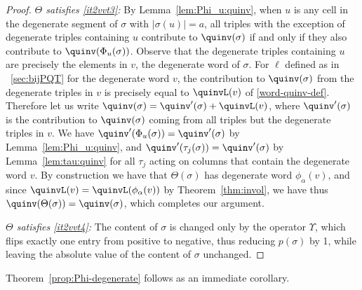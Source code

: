 \begin{proof}
\emph{$\Theta$ satisfies \ref{it2vvt3}:} By Lemma~\ref{lem:Phi_u:quinv}, when $u$ is any cell in the degenerate segment of $\sigma$ with $|\sigma(u)|=a$, all triples with the exception of degenerate triples containing $u$ contribute to $\quinv(\sigma)$ if and only if they also contribute to $\quinv(\Phi_u(\sigma))$. Observe that the degenerate triples containing $u$ are precisely the elements in $v$, the degenerate word of $\sigma$. For $\ell$ defined as in ~\ref{sec:bijPQT} for the degenerate word $v$,  the contribution to $\quinv(\sigma)$ from the degenerate triples in $v$ is precisely equal to $\quinvL(v)$ of \eqref{word-quinv-def}. Therefore let us write $\quinv(\sigma)=\quinv'(\sigma)+\quinvL(v)$, where $\quinv'(\sigma)$ is the contribution to $\quinv(\sigma)$ coming from all triples but the degenerate triples in $v$. We have $\quinv'(\Phi_u(\sigma))=\quinv'(\sigma)$ by Lemma~\ref{lem:Phi_u:quinv}, and $\quinv'(\tau_j(\sigma))=\quinv'(\sigma)$ by Lemma~\ref{lem:tau:quinv} for all $\tau_j$ acting on columns that contain the degenerate word $v$. By construction we have that $\Theta(\sigma)$ has degenerate word $\phi_\alpha(v)$, and since $\quinvL(v)=\quinvL(\phi_\alpha(v))$ by Theorem~\ref{thm:invol}, we have thus $\quinv(\Theta(\sigma))=\quinv(\sigma)$, which completes our argument.

\emph{$\Theta$ satisfies \ref{it2vvt4}:} The content of $\sigma$ is changed only by the operator $\Upsilon$, which flips exactly one entry from positive to negative, thus reducing $p(\sigma)$ by 1, while leaving the absolute value of the content of $\sigma$ unchanged.
\end{proof}
Theorem~\ref{prop:Phi-degenerate} follows as an immediate corollary.


